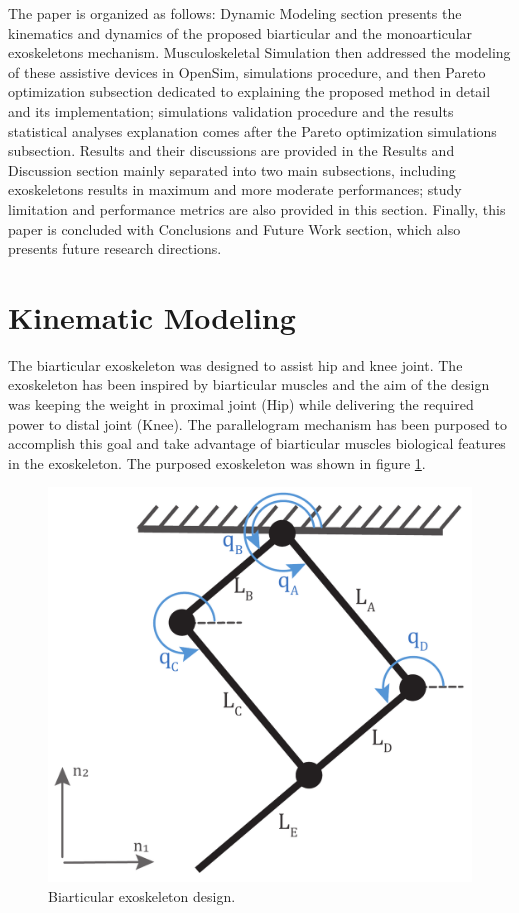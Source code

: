 \documentclass[10pt,letterpaper]{article}
\begin{document}
The paper is organized as follows: Dynamic Modeling section presents the kinematics and dynamics of the proposed biarticular and the monoarticular exoskeletons mechanism. Musculoskeletal Simulation then addressed the modeling of these assistive devices in OpenSim, simulations procedure, and then Pareto optimization subsection dedicated to explaining the proposed method in detail and its implementation; simulations validation procedure and the results statistical analyses explanation comes after the Pareto optimization simulations subsection. Results and their discussions are provided in the Results and Discussion section mainly separated into two main subsections, including exoskeletons results in maximum and more moderate performances; study limitation and performance metrics are also provided in this section. Finally, this paper is concluded with Conclusions and Future Work section, which also presents future research directions.
\section*{Kinematic Modeling}
The biarticular exoskeleton was designed to assist hip and knee joint. The exoskeleton has been inspired by biarticular muscles and the aim of the design was keeping the weight in proximal joint (Hip) while delivering the required power to distal joint (Knee). The parallelogram mechanism has been purposed to accomplish this goal and take advantage of biarticular muscles biological features in the exoskeleton.  The purposed exoskeleton was shown in figure \ref{Fig_Biarticular_Exo_Mechanism}.
\begin{figure}[h!]
	\centering
	\includegraphics[width=2 in]{Cartoons/Biarticular_Exo_Mechanism.pdf}
	\caption{Biarticular exoskeleton design.}
	\label{Fig_Biarticular_Exo_Mechanism}
\end{figure}
\end{document}
